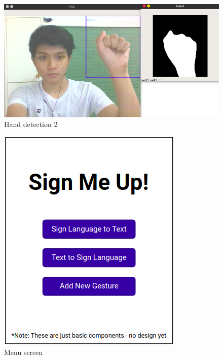 \documentclass[journal]{./IEEE/IEEEtran}
\begin{document}
\begin{figure}[ht!]
    \centering
    \includegraphics[width=.8\linewidth]{./images/init2.png}
    \caption{Hand detection 2}
    \label{fig:label1}
\end{figure}






\appendix
\begin{figure}[ht!]
    \centering
    \includegraphics[width=.95\linewidth]{./images/1.png}
    \caption{Menu screen}
    \label{fig:label1}
\end{figure}
\end{document}
